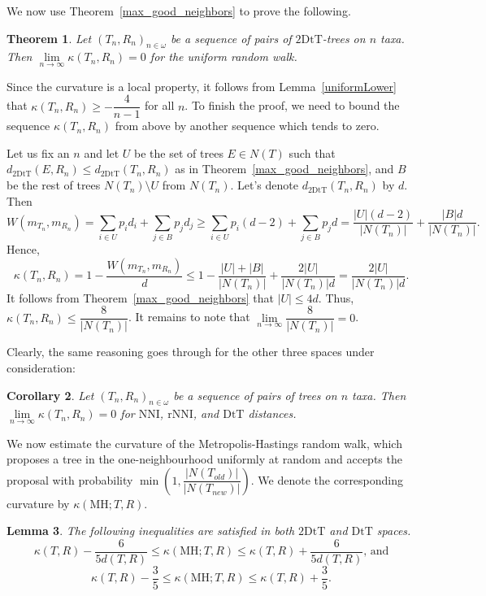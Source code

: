 \documentclass{amsart}
\newtheorem{lemma}{Lemma}
\newtheorem{corollary}[lemma]{Corollary}
\newtheorem{theorem}[lemma]{Theorem}
\newcommand{\dts}{\mathrm{2DtT}}
\newcommand{\nni}{\mathrm{NNI}}
\newcommand{\rnni}{\mathrm{rNNI}}
\newcommand{\mdts}{\mathrm{DtT}}
\newcommand{\MH}{\mathrm{MH}}
\begin{document}
We now use Theorem~\ref{max_good_neighbors} to prove the following.


\begin{theorem}\label{zero-in-the-limit}
Let $(T_n,R_n)_{n\in\omega}$ be a sequence of pairs of $\dts$-trees on $n$ taxa.
Then $\lim\limits_{n \to \infty}\kappa(T_n,R_n) = 0$ for the uniform random walk.
\end{theorem}

\proof
Since the curvature is a local property, it follows from Lemma~\ref{uniformLower} that $\kappa(T_n,R_n) \geq -\dfrac{4}{n-1}$ for all $n$.
To finish the proof, we need to bound the sequence $\kappa(T_n,R_n)$ from above by another sequence which tends to zero.

Let us fix an $n$ and let $U$ be the set of trees $E \in N(T)$ such that $d_\dts(E,R_n) \leq d_\dts(T_n,R_n)$ as in Theorem~\ref{max_good_neighbors}, and $B$ be the rest of trees $N(T_n)\setminus U$ from $N(T_n)$.
Let's denote $d_\dts(T_n,R_n)$ by $d$.
Then
\[
W(m_{T_n},m_{R_n}) = \sum_{i\in U} p_i d_i + \sum_{j\in B} p_j d_j \geq
\sum_{i\in U} p_i (d-2) + \sum_{j\in B} p_j d =
\frac{|U|(d-2)}{|N(T_n)|} + \frac{|B|d}{|N(T_n)|}.
\]
Hence,
\[
\kappa(T_n,R_n) = 1 - \frac{W(m_{T_n},m_{R_n})}{d} \leq
1 - \frac{|U| + |B|}{|N(T_n)|} + \frac{2|U|}{|N(T_n)|d}
= \frac{2|U|}{|N(T_n)|d}.
\]
It follows from Theorem~\ref{max_good_neighbors} that $|U| \leq 4d$.
Thus, $\kappa(T_n,R_n) \leq \dfrac{8}{|N(T_n)|}$.
It remains to note that $\lim\limits_{n\to\infty}\dfrac{8}{|N(T_n)|} = 0$.
\endproof

Clearly, the same reasoning goes through for the other three spaces under consideration:

\begin{corollary}
Let $(T_n,R_n)_{n\in\omega}$ be a sequence of pairs of trees on $n$ taxa.
Then $\lim\limits_{n \to \infty}\kappa(T_n,R_n) = 0$ for $\nni$, $\rnni$, and $\mdts$ distances.
\end{corollary}

We now estimate the curvature of the Metropolis-Hastings random walk, which proposes a tree in the one-neighbourhood uniformly at random and accepts the proposal with probability $\min\left(1, \dfrac{|N(T_{old})|}{|N(T_{new})|}\right)$.
We denote the corresponding curvature by $\kappa(\MH;T,R)$.

\begin{lemma}
The following inequalities are satisfied in both $\dts$ and $\mdts$ spaces.
\[
\kappa(T,R) - \dfrac{6}{5d(T,R)} \leq \kappa(\MH;T,R) \leq \kappa(T,R) +
\dfrac{6}{5d(T,R)}\mbox{, and}
\]
\[
\kappa(T,R) - \dfrac35 \leq \kappa(\MH;T,R) \leq \kappa(T,R) + \dfrac35.
\]
\end{lemma}
\end{document}
